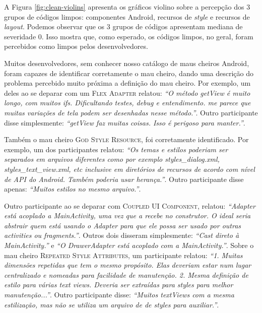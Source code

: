 A Figura \ref{fig:clean-violins} apresenta os gráficos violino sobre a percepção dos 3 grupos de códigos limpos: componentes Android, recursos de \textit{style} e recursos de \textit{layout}. Podemos observar que os 3 grupos de códigos apresentam mediana de severidade 0. Isso mostra que, como esperado, os códigos limpos, no geral, foram percebidos como limpos pelos desenvolvedores.

Muitos desenvolvedores, sem conhecer nosso catálogo de maus cheiros Android, foram capazes de identificar corretamente o mau cheiro, dando uma descrição do problema percebido muito próxima a definição do mau cheiro. Por exemplo, um deles ao se deparar com um \textsc{\small Flex Adapter} relatou: \textit{``O método getView é muito longo, com muitos ifs. Dificultando testes, debug e entendimento. me parece que muitas variações de tela podem ser desenhadas nesse método.''}. Outro participante disse simplesmente: \textit{``getView faz muitas coisas. Isso é perigoso para manter.''}.

Também o mau cheiro \textsc{\small God Style Resource}, foi corretamente identificado. Por exemplo, um dos participantes relatou: \textit{``Os temas e estilos poderiam ser separados em arquivos diferentes como por exemplo styles\_dialog.xml, styles\_text\_view.xml, etc inclusive em diretórios de recursos de acordo com nível de API do Android. Também poderia usar herança.''}. Outro participante disse apenas: \textit{``Muitos estilos no mesmo arquivo.''}.

Outro participante ao se deparar com \textsc{\small Coupled UI Component}, relatou: \textit{``Adapter está acoplado a MainActivity, uma vez que a recebe no construtor. O ideal seria abstrair quem está usando o Adapter para que ele possa ser usado por outras activities ou fragments.''}. Outros dois disseram simplesmente: \textit{``Cast direto à MainActivity.''} e \textit{``O DrawerAdapter está acoplado com a MainActivity.''}. Sobre o mau cheiro \textsc{\small Repeated Style Attributes}, um participante relatou: \textit{``1. Muitas dimensões repetidas que tem o mesmo propósito. Elas deveriam estar num lugar centralizado e nomeadas para facilidade de manutenção. 2. Mesma definição de estilo para várias text views. Deveria ser extraídas para styles para melhor manutenção...''}. Outro participante disse: \textit{``Muitos textViews com a mesma estilização, mas não se utiliza um arquivo de de styles para auxiliar.''}.

